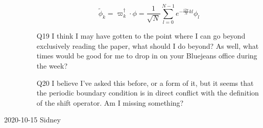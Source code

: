 \begin{description}
\begin{itemize}
$$\tilde{\phi}_k=\varpi^{\dagger}_k\cdot\phi=\frac{1}{\sqrt{N}}\sum^{N-1}_{l=0}e^{-\frac{i2\pi}{N}kl}\phi_l$$

\item[Q19]
I think I may have gotten to the point where I can go beyond exclusively reading the paper, what should I do beyond? As well, what times would be good for me to drop in on your Bluejeans office during the week?

\item[Q20]
I believe I've asked this before, or a form of it, but it seems that the periodic boundary condition is in direct conflict with the definition of the shift operator. Am I missing something?
\end{itemize} 

\item[2020-10-15 Sidney]


\end{description}
